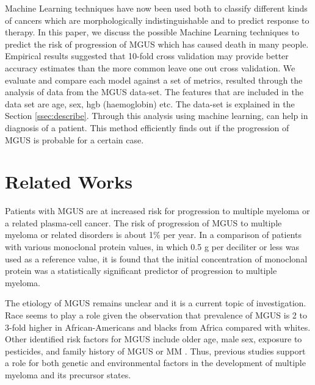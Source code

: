 \documentclass[conference]{IEEEtran}
\begin{document}
\par
Machine Learning techniques have now been used both to classify different kinds of cancers which are morphologically indistinguishable and to predict response to therapy. In this paper, we discuss the possible Machine Learning techniques to predict the risk of progression of MGUS which has caused death in many people. Empirical results suggested that 10-fold cross validation may provide better accuracy estimates than the more common leave one out cross validation. We evaluate and compare each model against a set of metrics, resulted through the analysis of data from the MGUS data-set. The features that are included in the data set are age, sex, hgb (haemoglobin) etc. The data-set is explained in the Section \ref{ssec:describe}. Through this analysis using machine learning, can help in diagnosis of a patient. This method efficiently finds out if the progression of MGUS is probable for a certain case.

\section{Related Works}
\par
Patients with MGUS are at increased risk for progression to multiple myeloma or a related plasma-cell cancer. The risk of progression of MGUS to multiple myeloma or related disorders is about 1\% per year. \cite{monoclonal1,monoclonal2} In a comparison of patients with various monoclonal protein values, in which 0.5 g per deciliter or less was used as a reference value, it is found that the initial concentration of monoclonal protein was a statistically significant predictor of progression to multiple myeloma.

\par

The etiology of MGUS remains unclear and it is a current topic of investigation. Race seems to play a role given the observation that prevalence of MGUS is 2 to 3-fold higher in African-Americans and blacks from Africa compared with whites. \cite{monoclonal6, monoclonal7} Other identified risk factors for MGUS include older age, male sex, exposure to pesticides, and family history of MGUS or MM \cite{monoclonal9,monoclonal10,monoclonal11}. Thus, previous studies support a role for both genetic and environmental factors in the development of multiple myeloma and its precursor states. \cite{monoclonal12}

\par
\end{document}
